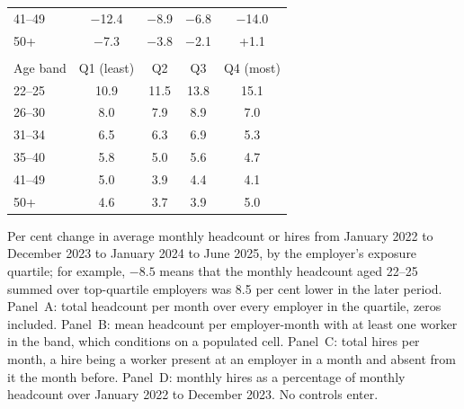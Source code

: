 \begin{table}[ht!]
\begin{tabular}{lcccc}
41--49 & $-$12.4 & $-$8.9 & $-$6.8 & $-$14.0 \\
50+ & $-$7.3 & $-$3.8 & $-$2.1 & +1.1 \\
\addlinespace[6pt]
\multicolumn{5}{l}{\textit{Panel D. Monthly hire rate, January 2022 to December 2023, per cent}} \\
\addlinespace[2pt]
Age band & Q1 (least) & Q2 & Q3 & Q4 (most) \\
\midrule
22--25 & 10.9 & 11.5 & 13.8 & 15.1 \\
26--30 & 8.0 & 7.9 & 8.9 & 7.0 \\
31--34 & 6.5 & 6.3 & 6.9 & 5.3 \\
35--40 & 5.8 & 5.0 & 5.6 & 4.7 \\
41--49 & 5.0 & 3.9 & 4.4 & 4.1 \\
50+ & 4.6 & 3.7 & 3.9 & 5.0 \\
\bottomrule
\end{tabular}
\begin{minipage}{0.92\textwidth}\footnotesize\vspace{4pt}
Per cent change in average monthly headcount or hires from January 2022 to December 2023 to January 2024 to June 2025, by the employer's exposure quartile; for example, $-8.5$ means that the monthly headcount aged 22--25 summed over top-quartile employers was 8.5 per cent lower in the later period. Panel~A: total headcount per month over every employer in the quartile, zeros included. Panel~B: mean headcount per employer-month with at least one worker in the band, which conditions on a populated cell. Panel~C: total hires per month, a hire being a worker present at an employer in a month and absent from it the month before. Panel~D: monthly hires as a percentage of monthly headcount over January 2022 to December 2023. No controls enter.
\end{minipage}
\end{table}
